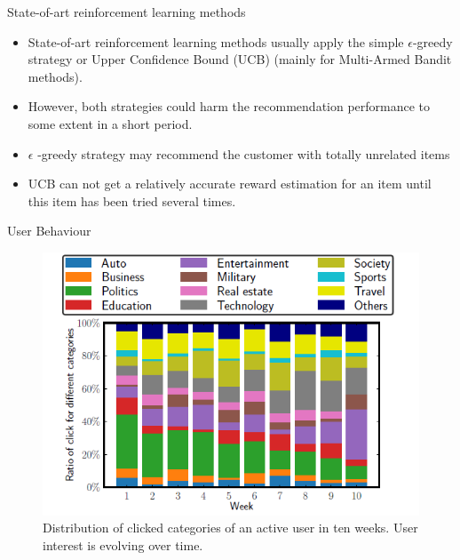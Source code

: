 \begin{frame}{State-of-art reinforcement learning methods}
   \begin{itemize}
       \item State-of-art reinforcement learning methods usually apply the simple $\epsilon$-greedy strategy \cite{mnih2015human} or Upper Confidence Bound (UCB) \cite{li2010contextual} (mainly for Multi-Armed Bandit methods). 
       \item However, both strategies could harm the recommendation performance to some extent in a short period. 
       \item $\epsilon$ -greedy strategy may recommend the customer with totally unrelated items
       \item UCB can not get a relatively accurate reward estimation for an item until this item has been tried several times.
\end{itemize}
\end{frame}


 \begin{frame}{User Behaviour}
         \begin{figure}
             \centering
             \includegraphics[scale = 0.6]{PPT/figure 1.png}
             \caption{Distribution of clicked categories of an active user
 in ten weeks. User interest is evolving over time.}
         \end{figure}
 \end{frame}

